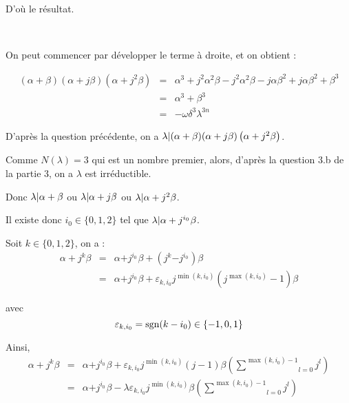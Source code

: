 D'o{\`u} le r{\'e}sultat.

\


 On peut commencer par d{\'e}velopper le terme {\`a} droite, et
on obtient :


\begin{eqnarray*}
  (\alpha + \beta) (\alpha + j \beta) \left( \alpha + j^2 \beta \right) & = &
  \alpha^3 + j^2 \alpha^2 \beta - j^2 \alpha^2 \beta - j  \alpha  \beta^2 + j 
  \alpha  \beta^2 + \beta^3\\
  & = & \alpha^3 + \beta^3\\
  & = & - \omega \delta^3 \lambda^{3 n}
\end{eqnarray*}


 D'apr{\`e}s la question pr{\'e}c{\'e}dente, on a $\lambda  |
 (\alpha + \beta) (\alpha + j \beta) \left( \alpha + j^2 \beta
\right)$.

Comme $N (\lambda) = 3$ qui est un nombre premier, alors, d'apr{\`e}s la
question 3.b de la partie 3, on a $\lambda$ est irr{\'e}ductible.

Donc $\lambda  |  \alpha + \beta$ ou $\lambda  |  \alpha +
j \beta$ ou $\lambda  |  \alpha + j^2 \beta$.

Il existe donc $i_0 \in \{ 0, 1, 2 \}$ tel que $\lambda  |  {\alpha
+ j^{i_0}}^{} \beta$.

Soit $k \in \{ 0, 1, 2 \}$, on a :
\begin{eqnarray*}
  \alpha + j^k \beta & = & \alpha {+ j^{i_0}}^{} \beta + \left( j^k {-
  j^{i_0}}^{} \right) \beta\\
  & = & \alpha {+ j^{i_0}}^{} \beta + \varepsilon_{k, i_0} j^{\min (k, i_0)}
  (j^{\max (k, i_0)} - 1) \beta
\end{eqnarray*}


avec
\[ \varepsilon_{k, i_0} = \operatorname{sgn} (k - i_0) \in \{ - 1, 0, 1 \} \]


Ainsi,
\begin{eqnarray*}
  \alpha + j^k \beta & = & \alpha {+ j^{i_0}}^{} \beta + \varepsilon_{k, i_0}
  j^{\min (k, i_0)} (j  - 1) \beta \left( \underset{l = 0}{\overset{\max (k,
  i_0) - 1}{\sum}} j^l \right)\\
  & = & \alpha {+ j^{i_0}}^{} \beta - \lambda \varepsilon_{k, i_0} j^{\min
  (k, i_0)} \beta \left( \underset{l = 0}{\overset{\max (k, i_0) - 1}{\sum}}
  j^l \right)
\end{eqnarray*}



